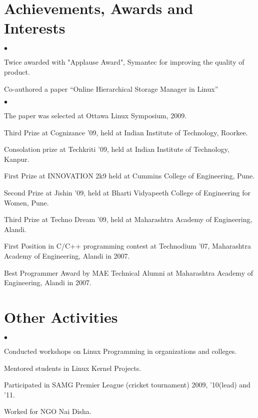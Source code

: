 \documentclass[letterpaper,margin,line]{RES}
\newenvironment{list2}{
  \begin{list}{$\bullet$}{%
      \setlength{\itemsep}{1pt}
      \setlength{\parsep}{0in} \setlength{\parskip}{0in}
      \setlength{\topsep}{0in} \setlength{\partopsep}{0in} 
      \setlength{\leftmargin}{0.2in}}}{\end{list}}
\begin{document}
\begin{resume}
\section{\sc Achievements, Awards and Interests}
\begin{list2}
\item Twice awarded with "Applause Award", Symantec for improving the quality of product.
\item Co-authored a paper “Online Hierarchical Storage Manager in Linux”
    \begin{list2}
    \item The paper was selected at Ottawa Linux Symposium, 2009.
    \item Third Prize at Cognizance '09, held at Indian Institute of Technology, Roorkee.
    \item Consolation prize at Techkriti '09, held at Indian Institute of Technology, Kanpur.
    \item First Prize at INNOVATION 2k9 held at Cummins College of Engineering, Pune.
    \item Second Prize at Jishin '09, held at Bharti Vidyapeeth College of Engineering for Women, Pune.
    \item Third Prize at Techno Dream '09, held at Maharashtra Academy of Engineering, Alandi.
     \end{list2}   
\item First Position in C/C++ programming contest at Technodium '07, Maharashtra Academy of Engineering, Alandi in 2007.
\item Best Programmer Award by MAE Technical Alumni at Maharashtra Academy of Engineering, Alandi in 2007.
\end{list2}

\section{\sc Other Activities}
\begin{list2}
\item Conducted workshops on Linux Programming in organizations and colleges.
\item Mentored students in Linux Kernel Projects.
\item Participated in SAMG Premier League (cricket tournament) 2009, '10(lead) and '11.
\item Worked for NGO Nai Disha. \\
\end{list2}


\end{resume}
\end{document}
